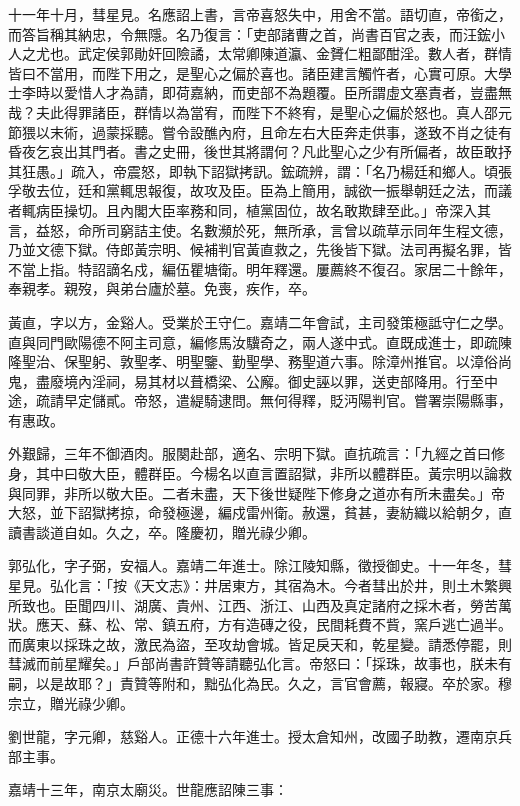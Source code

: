 \begin{pinyinscope}
{{十一年十月，彗星見。名應詔上書，言帝喜怒失中，用舍不當。語切直，帝銜之，而答旨稱其納忠，令無隱。名乃復言：「吏部諸曹之首，尚書百官之表，而汪鋐小人之尤也。武定侯郭勛奸回險譎，太常卿陳道瀛、金贇仁粗鄙酣淫。數人者，群情皆曰不當用，而陛下用之，是聖心之偏於喜也。諸臣建言觸忤者，心實可原。大學士李時以愛惜人才為請，即荷嘉納，而吏部不為題覆。臣所謂虛文塞責者，豈盡無哉？夫此得罪諸臣，群情以為當宥，而陛下不終宥，是聖心之偏於怒也。真人邵元節猥以末術，過蒙採聽。嘗令設醮內府，且命左右大臣奔走供事，遂致不肖之徒有昏夜乞哀出其門者。書之史冊，後世其將謂何？凡此聖心之少有所偏者，故臣敢抒其狂愚。」疏入，帝震怒，即執下詔獄拷訊。鋐疏辨，謂：「名乃楊廷和鄉人。頃張孚敬去位，廷和黨輒思報復，故攻及臣。臣為上簡用，誠欲一振舉朝廷之法，而議者輒病臣操切。且內閣大臣率務和同，植黨固位，故名敢欺肆至此。」帝深入其言，益怒，命所司窮詰主使。名數瀕於死，無所承，言曾以疏草示同年生程文德，乃並文德下獄。侍郎黃宗明、候補判官黃直救之，先後皆下獄。法司再擬名罪，皆不當上指。特詔謫名戍，編伍瞿塘衛。明年釋還。屢薦終不復召。家居二十餘年，奉親孝。親歿，與弟台廬於墓。免喪，疾作，卒。

黃直，字以方，金谿人。受業於王守仁。嘉靖二年會試，主司發策極詆守仁之學。直與同門歐陽德不阿主司意，編修馬汝驥奇之，兩人遂中式。直既成進士，即疏陳隆聖治、保聖躬、敦聖孝、明聖鑒、勤聖學、務聖道六事。除漳州推官。以漳俗尚鬼，盡廢境內淫祠，易其材以葺橋梁、公廨。御史誣以罪，送吏部降用。行至中途，疏請早定儲貳。帝怒，遣緹騎逮問。無何得釋，貶沔陽判官。嘗署崇陽縣事，有惠政。

外艱歸，三年不御酒肉。服闋赴部，適名、宗明下獄。直抗疏言：「九經之首曰修身，其中曰敬大臣，體群臣。今楊名以直言置詔獄，非所以體群臣。黃宗明以論救與同罪，非所以敬大臣。二者未盡，天下後世疑陛下修身之道亦有所未盡矣。」帝大怒，並下詔獄拷掠，命發極邊，編戍雷州衛。赦還，貧甚，妻紡織以給朝夕，直讀書談道自如。久之，卒。隆慶初，贈光祿少卿。

郭弘化，字子弼，安福人。嘉靖二年進士。除江陵知縣，徵授御史。十一年冬，彗星見。弘化言：「按《天文志》：井居東方，其宿為木。今者彗出於井，則土木繁興所致也。臣聞四川、湖廣、貴州、江西、浙江、山西及真定諸府之採木者，勞苦萬狀。應天、蘇、松、常、鎮五府，方有造磚之役，民間耗費不貲，窯戶逃亡過半。而廣東以採珠之故，激民為盜，至攻劫會城。皆足戾天和，乾星變。請悉停罷，則彗滅而前星耀矣。」戶部尚書許贊等請聽弘化言。帝怒曰：「採珠，故事也，朕未有嗣，以是故耶？」責贊等附和，黜弘化為民。久之，言官會薦，報寢。卒於家。穆宗立，贈光祿少卿。

劉世龍，字元卿，慈谿人。正德十六年進士。授太倉知州，改國子助教，遷南京兵部主事。

嘉靖十三年，南京太廟災。世龍應詔陳三事：

}}
\end{pinyinscope}
